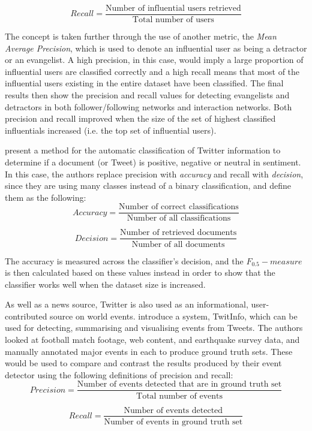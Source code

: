 \[
	Recall = \frac{\text{Number of influential users retrieved}}{\text{Total number of users}}
\]

The concept is taken further through the use of another metric, the \emph{Mean Average Precision}, which is used to denote an influential user as being a detractor or an evangelist. A high precision, in this case, would imply a large proportion of influential users are classified correctly and a high recall means that most of the influential users existing in the entire dataset have been classified. The final results then show the precision and recall values for detecting evangelists and detractors in both follower/following networks and interaction networks. Both precision and recall improved when the size of the set of highest classified influentials increased (i.e. the top set of influential users).

\citet{pak10} present a method for the automatic classification of Twitter information to determine if a document (or Tweet) is positive, negative or neutral in sentiment. In this case, the authors replace precision with \emph{accuracy} and recall with \emph{decision}, since they are using many classes instead of a binary classification, and define them as the following:
\[	
	Accuracy = \frac{\text{Number of correct classifications}}{\text{Number of all classifications}}
\]

\[
	Decision = \frac{\text{Number of retrieved documents}}{\text{Number of all documents}}
\]

The accuracy is measured across the classifier's decision, and the $ F_{0.5}-measure $  is then calculated based on these values instead in order to show that the classifier works well when the dataset size is increased.

As well as a news source, Twitter is also used as an informational, user-contributed source on world events. \citet{marcus11} introduce a system, TwitInfo, which can be used for detecting, summarising and visualising events from Tweets. The authors looked at football match footage, web content, and earthquake survey data, and manually annotated major events in each to produce ground truth sets. These would be used to compare and contrast the results produced by their event detector using the following definitions of precision and recall:
\[	
	Precision = \frac{\text{Number of events detected that are in ground truth set}}{\text{Total number of events}}
\]

\[
	Recall = \frac{\text{Number of events detected}}{\text{Number of events in ground truth set}}
\]

